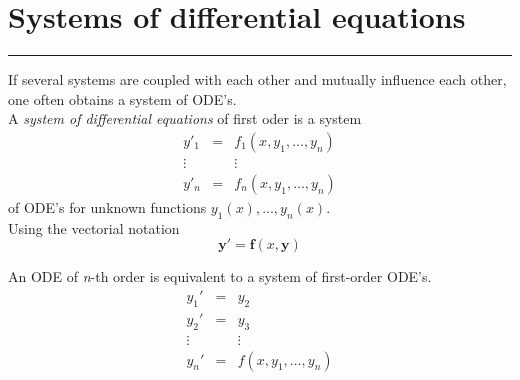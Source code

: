 \section{Systems of differential equations}
\noindent\rule[\linienAbstand]{\linewidth}{\linienDickeDick}
If several systems are coupled with each other and mutually influence each other, one often obtains a system of ODE’s.\\
A \emph{system of differential equations} of first oder is a system
\begin{equation}
  \begin{matrix}
    y'_1 & = & f_1(x, y_1,...,y_n)\\
    \vdots & & \vdots \;\;\;\;\; \; \; \; \; \; \; \; \; \; \; \; \; \; \\
    y'_n & = & f_n(x, y_1,...,y_n)
\end{matrix}
\end{equation}
of ODE’s for unknown functions $y_1(x), ... , y_n(x)$.\\
Using the vectorial notation
\begin{equation}
  \mathbf{y}' = \mathbf{f}(x, \mathbf{y})
\end{equation}

An ODE of \emph{n}-th order is equivalent to a system of first-order ODE's.
\begin{equation}
  \begin{matrix}
    y_1' & = & y_2\\
    y_2' & = & y_3\\
    \vdots  &  & \vdots \\
    y_n' & = & f(x, y_1, ..., y_n)
  \end{matrix}
\end{equation}

